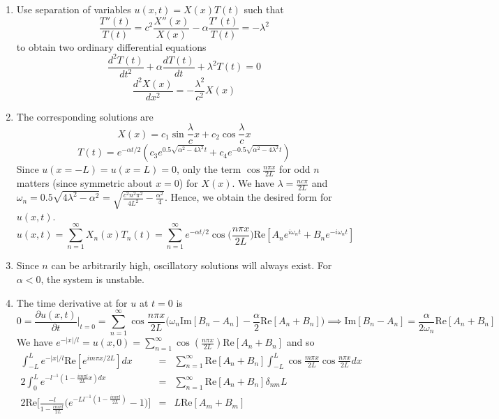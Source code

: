 \documentclass[a4paper]{article}
\begin{document}
\begin{ans}\leavevmode
\begin{enumerate}[label=(\roman*)]
    \item Use separation of variables $u(x,t)=X(x)T(t)$ such that
$$\frac{T''(t)}{T(t)}=c^2\frac{X''(x)}{X(x)}-\alpha\frac{T'(t)}{T(t)}=-\lambda^2$$
to obtain two ordinary differential equations
\begin{equation}
\frac{d^2T(t)}{dt^2}+\alpha \frac{dT(t)}{dt}+\lambda^2T(t)=0\tag{time}
\end{equation}
\begin{equation}
    \frac{d^2X(x)}{dx^2}=-\frac{\lambda^2}{c^2}X(x)\tag{position}
\end{equation}
\item The corresponding solutions are
$$X(x)=c_1\sin\frac{\lambda}{c}x+c_2\cos\frac{\lambda}{c}x$$
$$T(t)=e^{-\alpha t/2}(c_3e^{0.5\sqrt{\alpha^2-4\lambda^2}t}+c_4e^{-0.5\sqrt{\alpha^2-4\lambda^2}t})$$
Since $u(x=-L)=u(x=L)=0$, only the term $\cos\frac{n\pi x}{2L}$ for odd $n$ matters (since symmetric about $x=0$) for $X(x)$. We have $\lambda=\frac{nc\pi}{2L}$ and $\omega_n=0.5\sqrt{4\lambda^2-\alpha^2}=\sqrt{\frac{c^2n^2\pi^2}{4L^2}-\frac{\alpha^2}{4}}$. Hence, we obtain the desired form for $u(x,t)$.
$$u(x,t)=\sum_{n=1}^\infty X_n(x)T_n(t)=\sum_{n=1}^\infty e^{-\alpha t/2}\cos\bigg(\frac{n\pi x}{2L}\bigg)\text{Re}[A_ne^{i\omega_nt}+B_ne^{-i\omega_nt}]$$
\item Since $n$ can be arbitrarily high, oscillatory solutions will always exist. For $\alpha<0$, the system is unstable.
\item The time derivative at for $u$ at $t=0$ is
$$0=\frac{\partial u(x,t)}{\partial t}\bigg|_{t=0}=\sum_{n=1}^\infty\cos\frac{n\pi x}{2L}\bigg(\omega_n\text{Im}[B_n-A_n]-\frac{\alpha}{2}\text{Re}[A_n+B_n]\bigg)\implies\text{Im}[B_n-A_n]=\frac{\alpha}{2\omega_n}\text{Re}[A_n+B_n]$$
We have $e^{-|x|/l}=u(x,0)=\sum_{n=1}^\infty\cos(\frac{n\pi x}{2L})\text{Re}[A_n+B_n]$ and so
\begin{eqnarray}
\int_{-L}^Le^{-|x|/l}\text{Re}[e^{im\pi x/2L}]dx&=&\sum_{n=1}^\infty\text{Re}[A_n+B_n]\int_{-L}^L\cos\frac{m\pi x}{2L}\cos\frac{n\pi x}{2L}dx\nonumber\\2\int_{0}^Le^{-l^{-1}(1-\frac{im\pi l}{2L}x)dx}&=&\sum_{n=1}^\infty\text{Re}[A_n+B_n]\delta_{nm}L\nonumber\\2\text{Re}\bigg[\frac{-l}{1-\frac{im\pi l}{2L}}\bigg(e^{-Ll^{-1}(1-\frac{im\pi l}{2L})}-1\bigg)\bigg]&=&L\text{Re}[A_m+B_m]\nonumber
\end{eqnarray}

\end{enumerate}
\end{ans}
\end{document}
